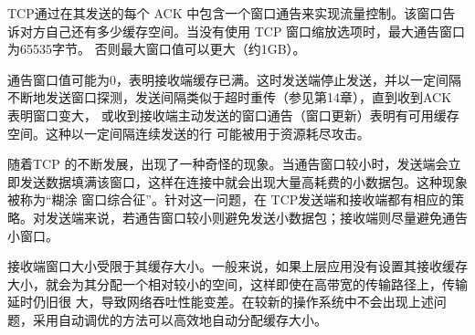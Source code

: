 TCP通过在其发送的每个 ACK 中包含一个窗口通告来实现流量控制。该窗口告诉对方自己还有多少缓存空间。当没有使用 TCP 窗口缩放选项时，最大通告窗口为65535字节。
否则最大窗口值可以更大（约1GB）。

通告窗口值可能为0，表明接收端缓存已满。这时发送端停止发送，并以一定间隔不断地发送窗口探测，发送间隔类似于超时重传（参见第14章），直到收到ACK 表明窗口变大，
或收到接收端主动发送的窗口通告（窗口更新）表明有可用缓存空间。这种以一定间隔连续发送的行 可能被用于资源耗尽攻击。

随着TCP 的不断发展，出现了一种奇怪的现象。当通告窗口较小时，发送端会立即发送数据填满该窗口，这样在连接中就会出现大量高耗费的小数据包。这种现象被称为“糊涂
窗口综合征”。针对这一问题，在 TCP发送端和接收端都有相应的策略。对发送端来说，若通告窗口较小则避免发送小数据包；接收端则尽量避免通告小窗口。

接收端窗口大小受限于其缓存大小。一般来说，如果上层应用没有设置其接收缓存大小，就会为其分配一个相对较小的空间，这样即使在高带宽的传输路径上，传输延时仍旧很
大，导致网络吞吐性能变差。在较新的操作系统中不会出现上述问题，采用自动调优的方法可以高效地自动分配缓存大小。
